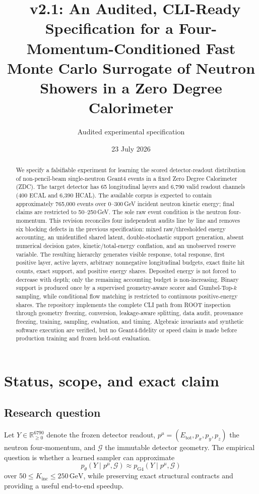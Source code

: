 \documentclass[10pt,a4paper]{article}
\title{\model\ v2.1: An Audited, CLI-Ready Specification for a Four-Momentum-Conditioned Fast Monte Carlo Surrogate of Neutron Showers in a Zero Degree Calorimeter}
\author{Audited experimental specification}
\date{23 July 2026}
\newcommand{\pFour}{p^{\mu}}
\newcommand{\Kinc}{K_{\mathrm{inc}}}
\newcommand{\Etot}{E_{\mathrm{tot}}}
\newcommand{\GeV}{\,\mathrm{GeV}}
\begin{document}
\maketitle

\begin{abstract}
We specify a falsifiable experiment for learning the scored detector-readout distribution of non-pencil-beam single-neutron Geant4 events in a fixed Zero Degree Calorimeter (ZDC). The target detector has 65 longitudinal layers and 6,790 valid readout channels (400 ECAL and 6,390 HCAL). The available corpus is expected to contain approximately 765,000 events over 0--300\,GeV incident neutron kinetic energy; final claims are restricted to 50--250\,GeV. The sole raw event condition is the neutron four-momentum. This revision reconciles four independent audits line by line and removes six blocking defects in the previous specification: mixed raw/thresholded energy accounting, an unidentified shared latent, double-stochastic support generation, absent numerical decision gates, kinetic/total-energy conflation, and an unobserved reserve variable. The resulting hierarchy generates visible response, total response, first positive layer, active layers, arbitrary nonnegative longitudinal budgets, exact finite hit counts, exact support, and positive energy shares. Deposited energy is not forced to decrease with depth; only the remaining accounting budget is non-increasing. Binary support is produced once by a supervised geometry-aware scorer and Gumbel-Top-$k$ sampling, while conditional flow matching is restricted to continuous positive-energy shares. The repository implements the complete CLI path from ROOT inspection through geometry freezing, conversion, leakage-aware splitting, data audit, provenance freezing, training, sampling, evaluation, and timing. Algebraic invariants and synthetic software execution are verified, but no Geant4-fidelity or speed claim is made before production training and frozen held-out evaluation.
\end{abstract}

\tableofcontents
\newpage

\section{Status, scope, and exact claim}

\subsection{Research question}
Let $Y\in\mathbb{R}_{\ge 0}^{6790}$ denote the frozen detector readout, $\pFour=(\Etot,p_x,p_y,p_z)$ the neutron four-momentum, and $\mathcal G$ the immutable detector geometry. The empirical question is whether a learned sampler can approximate
\begin{equation}
 p_{\theta}(Y\mid \pFour,\mathcal G) \approx p_{\mathrm{G4}}(Y\mid \pFour,\mathcal G)
 \label{eq:target}
\end{equation}
over $50\le \Kinc\le250\GeV$, while preserving exact structural contracts and providing a useful end-to-end speedup.
\end{document}

